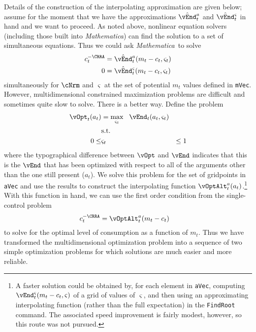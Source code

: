 \documentclass[titlepage, headings=optiontotocandhead]{\econtex}
\newcommand{\Mma}{\textit{Mathematica}}
\begin{document}
Details of the construction of the interpolating approximation are
given below; assume for the moment that we have the approximations
$\hat{\vEnd}_{t}^{{a}}$ and $\hat{\vEnd}_{t}^{\varsigma}$ in
hand and we want to proceed.  As noted above, nonlinear equation
solvers (including those built into {\Mma}) can find the
solution to a set of simultaneous equations.  Thus we could ask
{\Mma}~to solve
\begin{equation}\begin{gathered}\begin{aligned}
      {c}_{t}^{-\CRRA}  & = \hat{\vEnd}^{a}_{t}({m}_{t}-{c}_{t},\varsigma_{t}) %
      \\      0  & = \hat{\vEnd}^{\varsigma}_{t}({m}_{t}-{c}_{t},\varsigma_{t}) \label{eq:FOCwrtw}
    \end{aligned}\end{gathered}\end{equation}
simultaneously for $\cNrm$ and $\varsigma$ at the set of potential ${m}_{t}$ values defined in
\texttt{mVec}. However, multidimensional constrained
maximization problems are difficult and sometimes quite slow to
solve.  There is a better way.  Define the problem
\begin{equation}\begin{gathered}\begin{aligned}
      \vOpt_{t}({a}_{t})  & = \max_{\varsigma_{t}} ~~  \vEnd_{t}({a}_{t},\varsigma_{t})
      \\      & \text{s.t.} & \nonumber
      \\      0 \leq & \varsigma_{t} & \leq 1
    \end{aligned}\end{gathered}\end{equation}
where the typographical difference between $\vOpt$ and $\vEnd$
indicates that this is the $\vEnd$ that has been optimized with
respect to all of the arguments other than the one still present
(${a}_{t}$).  We solve this problem for the set of gridpoints in
\texttt{aVec} and use the results to construct the interpolating
function $\vOptAlt_{t}^{a}({a}_{t})$.\footnote{A faster solution
  could be obtained by, for each element in \texttt{aVec}, computing
  $\vEnd^{\varsigma}_{t}({m}_{t}-{c}_{t},\varsigma)$ of a grid of
  values of $\varsigma$, and then using an approximating interpolating
  function (rather than the full expectation) in the \texttt{FindRoot}
  command.  The associated speed improvement is fairly modest,
  however, so this route was not pursued.}  With this function in
hand, we can use the first order condition from the single-control
problem
\begin{equation*}\begin{gathered}\begin{aligned}
      {c}_{t}^{-\CRRA}  & = \vOptAlt_{t}^{{a}}({m}_{t}-{c}_{t})
    \end{aligned}\end{gathered}\end{equation*}
to solve for the optimal level of consumption as a function of
${m}_{t}$.  Thus we have transformed the multidimensional optimization
problem into a sequence of two simple optimization problems for which
solutions are much easier and more reliable.
\end{document}
